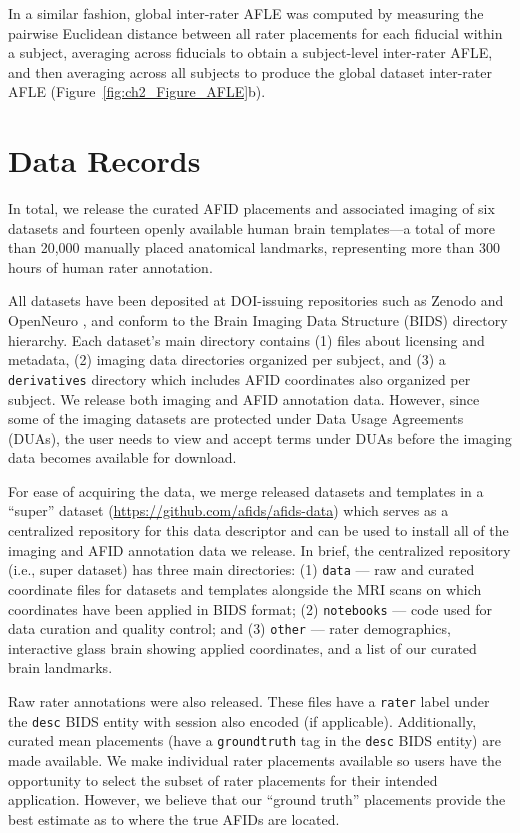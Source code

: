 In a similar fashion, global inter-rater AFLE was computed by measuring the pairwise Euclidean distance between all rater placements for each fiducial within a subject, averaging across fiducials to obtain a subject-level inter-rater AFLE, and then averaging across all subjects to produce the global dataset inter-rater AFLE (Figure~\ref{fig:ch2_Figure_AFLE}b).

\section{Data Records}

In total, we release the curated AFID placements and associated imaging of six datasets and fourteen openly available human brain templates—a total of more than 20,000 manually placed anatomical landmarks, representing more than 300 hours of human rater annotation.

All datasets have been deposited at DOI-issuing repositories such as Zenodo and OpenNeuro \cite{Taha2023-lt, Lau2023-db, Lau2023-op, Abbass2023-yl}, and conform to the Brain Imaging Data Structure (BIDS) directory hierarchy. Each dataset’s main directory contains (1) files about licensing and metadata, (2) imaging data directories organized per subject, and (3) a \texttt{derivatives} directory which includes AFID coordinates also organized per subject. We release both imaging and AFID annotation data. However, since some of the imaging datasets are protected under Data Usage Agreements (DUAs), the user needs to view and accept terms under DUAs before the imaging data becomes available for download.

For ease of acquiring the data, we merge released datasets and templates in a “super” dataset (\url{https://github.com/afids/afids-data}) which serves as a centralized repository for this data descriptor and can be used to install all of the imaging and AFID annotation data we release. In brief, the centralized repository (i.e., super dataset) has three main directories: (1) \texttt{data} — raw and curated coordinate files for datasets and templates alongside the MRI scans on which coordinates have been applied in BIDS format; (2) \texttt{notebooks} — code used for data curation and quality control; and (3) \texttt{other} — rater demographics, interactive glass brain showing applied coordinates, and a list of our curated brain landmarks.

Raw rater annotations were also released. These files have a \texttt{rater} label under the \texttt{desc} BIDS entity with session also encoded (if applicable). Additionally, curated mean placements (have a \texttt{groundtruth} tag in the \texttt{desc} BIDS entity) are made available. We make individual rater placements available so users have the opportunity to select the subset of rater placements for their intended application. However, we believe that our “ground truth” placements provide the best estimate as to where the true AFIDs are located.


